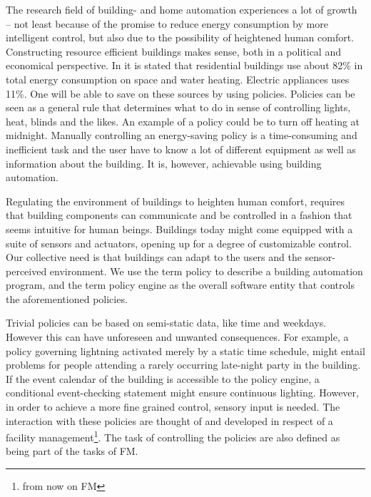 The research field of building- and home automation experiences a lot of growth -- not least because of the promise to reduce energy consumption by more intelligent control, but also due to the possibility of heightened human comfort. Constructing resource efficient buildings makes sense, both in a political and economical perspective. In \cite{janssen2004towards} it is stated that residential buildings use about 82\% in total energy consumption on space and water heating. Electric appliances uses 11\%. One will be able to save on these sources by using policies. Policies can be seen as a general rule that determines what to do in sense of controlling lights, heat, blinds and the likes. An example of a policy could be to turn off heating at midnight. Manually controlling an energy-saving policy is a time-consuming and inefficient task and the user have to know a lot of different equipment as well as information about the building. It is, however, achievable using building automation. 

Regulating the environment of buildings to heighten human comfort, requires that building components can communicate and be controlled in a fashion that seems intuitive for human beings. Buildings today might come equipped with a suite of sensors and actuators, opening up for a degree of customizable control. Our collective need is that buildings can adapt to the users and the sensor-perceived environment. We use the term policy to describe a building automation program, and the term policy engine as the overall software entity that controls the aforementioned policies.

Trivial policies can be based on semi-static data, like time and weekdays. However this can have unforeseen and unwanted consequences. For example, a policy governing lightning activated merely by a static time schedule, might entail problems for people attending a rarely occurring late-night party in the building. If the event calendar of the building is accessible to the policy engine, a conditional event-checking statement might ensure continuous lighting. However, in order to achieve a more fine grained control, sensory input is needed. The interaction with these policies are thought of and developed in respect of a facility management\footnote{from now on FM}. The task of controlling the policies are also defined as being part of the tasks of FM.

